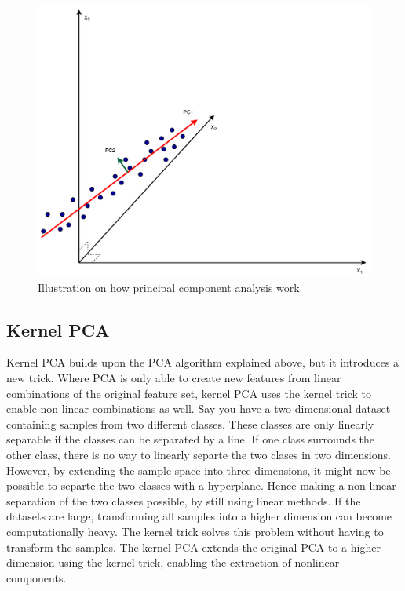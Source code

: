         \begin{figure}
            \centering
            \includegraphics[width=\textwidth]{report/figures/techniques/PCA.pdf}
            \caption{Illustration on how principal component analysis work}
            \label{fig:tech:PCA}
        \end{figure}
        
        

    
    \subsection{Kernel PCA}\label{subsec:kernelPCA}
        Kernel PCA builds upon the PCA algorithm explained above, but it introduces a new trick. Where PCA is only able to create new features from linear combinations of the original feature set, kernel PCA uses the kernel trick to enable non-linear combinations as well. Say you have a two dimensional dataset containing samples from two different classes.  These classes are only linearly separable if the classes can be separated by a line. If one class surrounds the other class, there is no way to linearly separte the two clases in two dimensions. However, by extending the sample space into three dimensions, it might now be possible to separte the two classes with a hyperplane. Hence making a non-linear separation of the two classes possible, by still using linear methods. If the datasets are large, transforming all samples into a higher dimension can become computationally heavy. The kernel trick solves this problem without having to transform the samples. The kernel PCA extends the original PCA to a higher dimension using the kernel trick, enabling the extraction of nonlinear components.  
    
